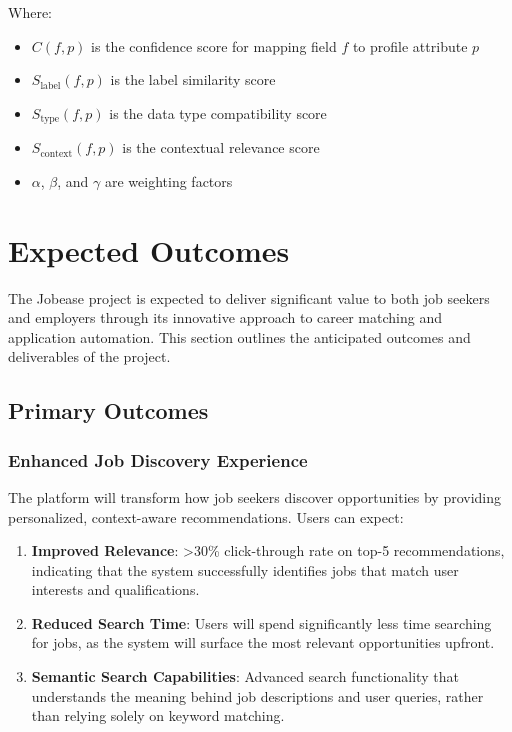 \documentclass[12pt,a4paper]{report}
\begin{document}
Where:
\begin{itemize}
    \item $C(f, p)$ is the confidence score for mapping field $f$ to profile attribute $p$
    \item $S_{\text{label}}(f, p)$ is the label similarity score
    \item $S_{\text{type}}(f, p)$ is the data type compatibility score
    \item $S_{\text{context}}(f, p)$ is the contextual relevance score
    \item $\alpha$, $\beta$, and $\gamma$ are weighting factors
\end{itemize}

\chapter{Expected Outcomes}

The Jobease project is expected to deliver significant value to both job seekers and employers through its innovative approach to career matching and application automation. This section outlines the anticipated outcomes and deliverables of the project.

\section*{Primary Outcomes}

\subsection*{Enhanced Job Discovery Experience}

The platform will transform how job seekers discover opportunities by providing personalized, context-aware recommendations. Users can expect:

\begin{enumerate}
    \item \textbf{Improved Relevance}: >30\% click-through rate on top-5 recommendations, indicating that the system successfully identifies jobs that match user interests and qualifications.
    \item \textbf{Reduced Search Time}: Users will spend significantly less time searching for jobs, as the system will surface the most relevant opportunities upfront.
    \item \textbf{Semantic Search Capabilities}: Advanced search functionality that understands the meaning behind job descriptions and user queries, rather than relying solely on keyword matching.
\end{enumerate}
\end{document}
